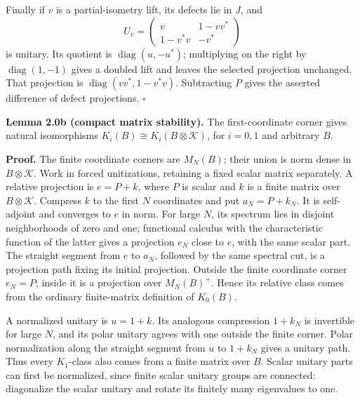 \documentclass[
  11pt,
]{article}
\begin{document}
Finally if \(v\) is a partial-isometry lift, its defects lie in \(J\),
and \[
U_v=\begin{pmatrix}v&1-vv^*\\1-v^*v&-v^*\end{pmatrix}
\] is unitary. Its quotient is \(\operatorname{diag}(u,-u^*)\);
multiplying on the right by \(\operatorname{diag}(1,-1)\) gives a
doubled lift and leaves the selected projection unchanged. That
projection is \(\operatorname{diag}(vv^*,1-v^*v)\). Subtracting \(P\)
gives the asserted difference of defect projections. \(\square\)

\textbf{Lemma 2.0b (compact matrix stability).} The first-coordinate
corner gives natural isomorphisms
\(K_i(B)\cong K_i(B\otimes\mathcal K)\), for \(i=0,1\) and arbitrary
\(B\).

\textbf{Proof.} The finite coordinate corners are \(M_N(B)\); their
union is norm dense in \(B\otimes\mathcal K\). Work in forced
unitizations, retaining a fixed scalar matrix separately. A relative
projection is \(e=P+k\), where \(P\) is scalar and \(k\) is a finite
matrix over \(B\otimes\mathcal K\). Compress \(k\) to the first \(N\)
coordinates and put \(a_N=P+k_N\). It is self-adjoint and converges to
\(e\) in norm. For large \(N\), its spectrum lies in disjoint
neighborhoods of zero and one; functional calculus with the
characteristic function of the latter gives a projection \(e_N\) close
to \(e\), with the same scalar part. The straight segment from \(e\) to
\(a_N\), followed by the same spectral cut, is a projection path fixing
its initial projection. Outside the finite coordinate corner \(e_N=P\);
inside it is a projection over \(M_N(B)^+\). Hence its relative class
comes from the ordinary finite-matrix definition of \(K_0(B)\).

A normalized unitary is \(u=1+k\). Its analogous compression \(1+k_N\)
is invertible for large \(N\), and its polar unitary agrees with one
outside the finite corner. Polar normalization along the straight
segment from \(u\) to \(1+k_N\) gives a unitary path. Thus every
\(K_1\)-class also comes from a finite matrix over \(B\). Scalar unitary
parts can first be normalized, since finite scalar unitary groups are
connected: diagonalize the scalar unitary and rotate its finitely many
eigenvalues to one.
\end{document}
